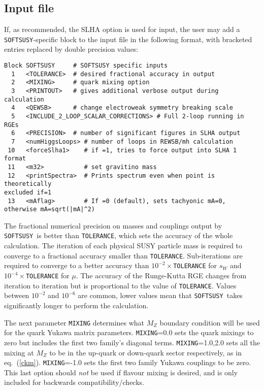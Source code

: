 \documentclass[]{article}
\def\SOFTSUSY{{\tt SOFTSUSY}}
\def\code#1{\small{\tt #1}\normalsize}
\begin{document}
\subsection{Input file \label{sec:input}}

If, as recommended, the SLHA option is used for input, the user may
add
a \SOFTSUSY-specific block to the input file in the following format, with
bracketed entries replaced by double precision values:
\small
\begin{verbatim}
Block SOFTSUSY     # SOFTSUSY specific inputs
  1   <TOLERANCE>  # desired fractional accuracy in output
  2   <MIXING>     # quark mixing option
  3   <PRINTOUT>   # gives additional verbose output during calculation
  4   <QEWSB>      # change electroweak symmetry breaking scale
  5   <INCLUDE_2_LOOP_SCALAR_CORRECTIONS> # Full 2-loop running in RGEs
  6   <PRECISION>  # number of significant figures in SLHA output
  7   <numHiggsLoops> # number of loops in REWSB/mh calculation
 10   <forceSlha1>    # if =1, tries to force output into SLHA 1 format
 11   <m32>           # set gravitino mass
 12   <printSpectra>  # Prints spectrum even when point is theoretically
excluded if=1
 13   <mAflag>        # If =0 (default), sets tachyonic mA=0, otherwise mA=sqrt(|mA|^2)
\end{verbatim}
\normalsize
The fractional numerical precision on masses and couplings output by \SOFTSUSY~is better than \code{TOLERANCE}, which
sets the accuracy of the whole calculation. The iteration of
each physical SUSY particle mass is required to converge to a
fractional accuracy smaller than \code{TOLERANCE}. Sub-iterations are required
to converge to a better accuracy than $10^{-2}\times$\code{TOLERANCE} for
$s_W$ and 
$10^{-4}\times$\code{TOLERANCE} for $\mu$. The accuracy of the Runge-Kutta RGE
changes from iteration to iteration but is proportional to the value of 
\code{TOLERANCE}. Values between $10^{-2}$ and $10^{-6}$ are common, lower
values  
mean that \SOFTSUSY~takes significantly longer to perform the calculation.

The next parameter
\code{MIXING} determines what $M_Z$ boundary condition will be used for the
quark Yukawa matrix parameters.
\code{MIXING}=0.0 sets the quark mixings to zero but includes the first two 
family's diagonal terms.
\code{MIXING}=1.0,2.0 sets all the mixing at $M_Z$
to be in the up-quark or down-quark
sector respectively, as in eq.~(\ref{ckm}).
\code{MIXING}=-1.0 sets the first two family Yukawa couplings to be zero. This
last option should {\em not}\/ be used if flavour mixing is desired, and is
only included for backwards compatibility/checks.
\end{document}
